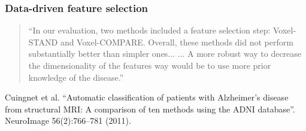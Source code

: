 \begin{frame}
\frametitle{Data-driven feature selection}
\begin{quote}
``In our evaluation, two methods included a feature selection step: Voxel-STAND and Voxel-COMPARE.
Overall, these methods did not perform substantially better than simpler ones... ...
A more robust way to decrease the dimensionality of the features way would be to use more prior knowledge of the disease.''


\end{quote}

\begin{center}
\begin{tiny}
Cuingnet et al. ``Automatic classification of patients with Alzheimer's disease from structural MRI: A comparison of ten methods using the ADNI database''.  NeuroImage 56(2):766--781 (2011).\par
\end{tiny}
\end{center}
\end{frame}

